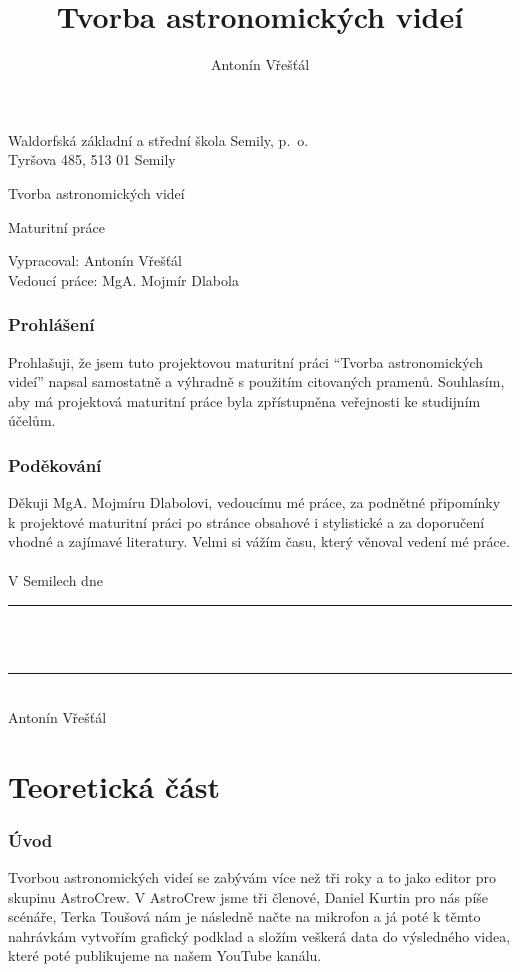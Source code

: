 \documentclass[12pt,a4paper,titlepage]{article}
\author{Antonín Vřešťál}
\title{Tvorba astronomických videí}
\begin{document}
\begin{titlepage}
	\begin{center}
		Waldorfská základní a střední škola Semily, p.\  o.\\
		Tyršova 485, 513 01 Semily
		\vspace*{1cm}
 
		\vfill		

		\Huge
		Tvorba astronomických videí
 
		\normalsize
		\vspace{0.5cm}
		 Maturitní práce 	 
		 
		\vfill		
	\end{center}
	Vypracoval: Antonín Vřešťál\\
	Vedoucí práce: MgA. Mojmír Dlabola\\
 \end{titlepage}
\newpage
\section*{Prohlášení}
Prohlašuji, že jsem tuto projektovou maturitní práci \enquote{Tvorba astronomických videí} napsal samostatně a výhradně s použitím citovaných pramenů. Souhlasím, aby má projektová maturitní práce byla zpřístupněna veřejnosti ke studijním účelům.
\section*{Poděkování}
Děkuji MgA. Mojmíru Dlabolovi, vedoucímu mé práce, za podnětné připomínky k projektové maturitní práci po stránce obsahové i stylistické a za doporučení vhodné a zajímavé literatury. Velmi si vážím času, který věnoval vedení mé práce.\\
\\
V Semilech dne \hspace{0.5cm} \rule[-3pt]{1.5in}{0.5pt}\\
\\
\hspace{0.5cm} \rule[-3pt]{5.5cm}{0.5pt}\\
\indent \indent Antonín Vřešťál\\

\newpage
\tableofcontents
\newpage
\part{Teoretická část}
\section{Úvod}
Tvorbou astronomických videí se zabývám více než tři roky a to jako editor pro skupinu AstroCrew. V AstroCrew jsme tři členové, Daniel Kurtin pro nás píše scénáře, Terka Toušová nám je následně načte na mikrofon a já poté k těmto nahrávkám vytvořím grafický podklad a složím veškerá data do výsledného videa, které poté publikujeme na našem YouTube kanálu. 
\end{document}

